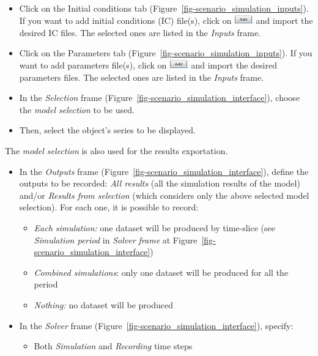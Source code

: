 \documentclass[
  letterpaper,
  DIV=11,
  numbers=noendperiod]{scrreprt}
\providecommand{\tightlist}{%
  \setlength{\itemsep}{0pt}\setlength{\parskip}{0pt}}\usepackage{longtable,booktabs,array}
\begin{document}
\begin{itemize}
\item
  {Click on the Initial conditions tab
  (Figure~\ref{fig-scenario_simulation_inputs}). If you want to add
  initial conditions (IC) file(s), click on
  \includegraphics[width=\textwidth,height=0.16in]{./figures/fig-icon_add_button.png}
  and import the desired IC files. The selected ones are listed in the
  \emph{Inputs} frame.}
\item
  {Click on the Parameters tab
  (Figure~\ref{fig-scenario_simulation_inputs}). If you want to add
  parameters file(s), click on
  \includegraphics[width=\textwidth,height=0.16in]{./figures/fig-icon_add_button.png}
  and import the desired parameters files. The selected ones are listed
  in the \emph{Inputs} frame.}
\item
  {In the \emph{Selection} frame
  (Figure~\ref{fig-scenario_simulation_interface}), choose the
  \emph{model selection} to be used.}
\item
  {Then, select the object's series to be displayed.}
\end{itemize}

The \emph{model selection} is also used for the results exportation.

\begin{itemize}
\item
  {In the \emph{Outputs} frame
  (Figure~\ref{fig-scenario_simulation_interface}), define the outputs
  to be recorded: \emph{All results} (all the simulation results of the
  model) and/or \emph{Results from selection} (which considers only the
  above selected model selection). For each one, it is possible to
  record:}

  \begin{itemize}
  \item
    {\emph{Each simulation:} one dataset will be produced by time-slice
    (see \emph{Simulation period} in \emph{Solver frame} at
    Figure~\ref{fig-scenario_simulation_interface})}
  \item
    {\emph{Combined simulations}: only one dataset will be produced for
    all the period}
  \item
    {\emph{Nothing:} no dataset will be produced}
  \end{itemize}
\item
  {In the \emph{Solver} frame
  (Figure~\ref{fig-scenario_simulation_interface}), specify:}

  \begin{itemize}
  \tightlist
  \item
    {Both \emph{Simulation} and \emph{Recording} time steps}
  \end{itemize}
\end{itemize}
\end{document}
